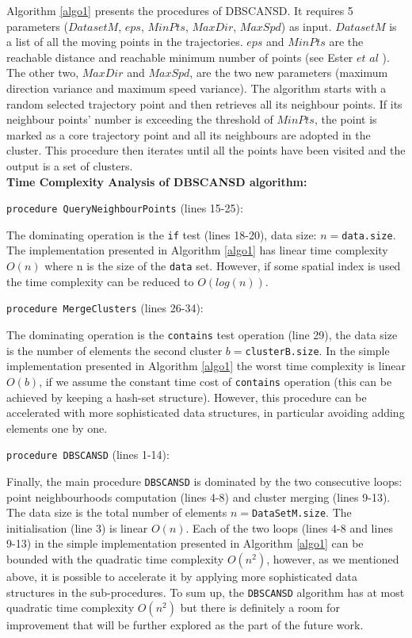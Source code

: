 \documentclass[12pt,glossary]{dalcsthesis}
\begin{document}
Algorithm \ref{algo1} presents the procedures of DBSCANSD. It requires 5 parameters ($DatasetM$, $eps$, $MinPts$, $MaxDir$, $MaxSpd$) as input. $DatasetM$ is a list of all the moving points in the trajectories.  $eps$ and $MinPts$ are the reachable distance and reachable minimum number of points (see Ester $et$ $al$ \cite{DBScan96}).  The other two, $MaxDir$ and $MaxSpd$, are the two new parameters (maximum direction variance and maximum speed variance).  The algorithm starts with a random selected trajectory point and then retrieves all its neighbour points. If its neighbour points' number is exceeding the threshold of $MinPts$, the point is marked as a core trajectory point and all its neighbours are adopted in the cluster. This procedure then iterates until all the points have been visited and the output is a set of clusters. \\



\noindent\textbf{Time Complexity Analysis of DBSCANSD algorithm:}

\noindent\texttt{procedure QueryNeighbourPoints} (lines 15-25):

\noindent The dominating operation is the \texttt{if} test (lines 18-20), data size: $n=$\texttt{data.size}.
The implementation presented in Algorithm \ref{algo1} has linear time complexity $O(n)$ where n is the size of the \texttt{data} set. However, if some spatial index is used the time complexity can be reduced to $O(log(n))$.


\noindent\texttt{procedure MergeClusters} (lines 26-34):

\noindent The dominating operation is the \texttt{contains} test operation (line 29), the data size is the number of elements the second cluster $b=$\texttt{clusterB.size}.
In the simple implementation presented in Algorithm \ref{algo1} the worst time complexity is linear $O(b)$, if we assume the constant time cost of \texttt{contains} operation (this can be achieved by keeping a hash-set structure). However, this procedure can be accelerated with more sophisticated data structures, in particular avoiding adding elements one by one.

\noindent\texttt{procedure DBSCANSD} (lines 1-14):

\noindent Finally, the main procedure \texttt{DBSCANSD} is dominated by the two consecutive loops: point neighbourhoods computation (lines 4-8) and cluster merging (lines 9-13). The data size is the total number of elements $n=$\texttt{DataSetM.size}. The initialisation (line 3) is linear $O(n)$. Each of the two loops (lines 4-8 and lines 9-13) in the simple implementation presented in Algorithm \ref{algo1} can be bounded with the quadratic time complexity $O(n^2)$, however, as we mentioned above, it is possible to accelerate it by applying more sophisticated data structures in the sub-procedures. To sum up, the \texttt{DBSCANSD} algorithm has at most quadratic time complexity $O(n^2)$ but there is definitely a room for improvement that will be further explored as the part of the future work. \\
\end{document}
